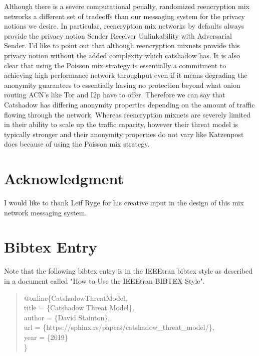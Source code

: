 \documentclass[conference]{IEEEtran}
\begin{document}
Although there is a severe computational penalty, randomized
reencryption mix networks a different set of tradeoffs than our
messaging system for the privacy notions we desire. In particular,
reencryption mix networks by defaults always provide the privacy
notion Sender Receiver Unlinkability with Adversarial Sender. I'd like
to point out that although reencryption mixnets provide this privacy
notion without the added complexity which catshadow has. It is also
clear that using the Poisson mix strategy is essentially a commitment
to achieving high performance network throughput even if it means
degrading the anonymity guarantees to essentially having no protection
beyond what onion routing ACN's like Tor and I2p have to
offer. Therefore we can say that Catshadow has differing anonymity
properties depending on the amount of traffic flowing through the
network. Whereas reencryption mixnets are severely limited in their
ability to scale up the traffic capacity, however their threat model
is typically stronger and their anonymity properties do not vary like
Katzenpost does because of using the Poisson mix strategy.

\section{Acknowledgment}
I would like to thank Leif Ryge for his creative input in the design
of this mix network messaging system.

{\footnotesize 

}


\appendices

\section{Bibtex Entry}
\label{FirstAppendix}

Note that the following bibtex entry is in the IEEEtran bibtex style
as described in a document called "How to Use the IEEEtran BIBTEX Style".
\vspace{8pt}
\begin{quote}
   @online\{CatshadowThreatModel,\\
   \hspace*{5pt} title = \{Catshadow Threat Model\},\\
   \hspace*{5pt} author = \{David Stainton\},\\
   \hspace*{5pt} url = \{https://sphinx.rs/papers/catshadow\_threat\_model/\},\\
   \hspace*{5pt} year = \{2019\}\\
   \}\\
\end{quote}
\end{document}
